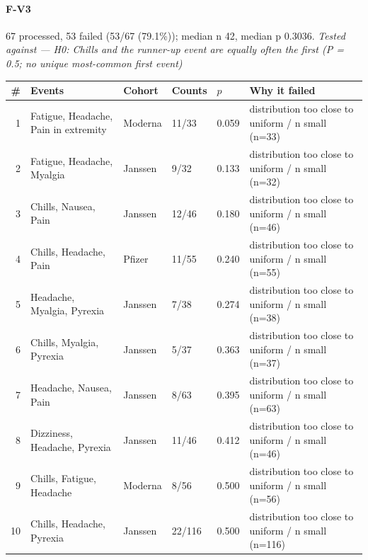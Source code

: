 \documentclass[11pt]{article}
\begin{document}
\paragraph{F-V3} 67 processed, 53 failed (53/67 (79.1\%)); median n 42, median p 0.3036. \emph{Tested against --- H0: Chills and the runner-up event are equally often the first (P = 0.5; no unique most-common first event)} \\
\begin{longtable}{@{}r p{3.9cm} p{2.5cm} l l p{4.4cm}@{}}
\toprule
\# & Events & Cohort & Counts & $p$ & Why it failed \\
\midrule \endhead
1 & Fatigue, Headache, Pain in extremity & Moderna & 11/33 & 0.059 & distribution too close to uniform / n small (n=33) \\
2 & Fatigue, Headache, Myalgia & Janssen & 9/32 & 0.133 & distribution too close to uniform / n small (n=32) \\
3 & Chills, Nausea, Pain & Janssen & 12/46 & 0.180 & distribution too close to uniform / n small (n=46) \\
4 & Chills, Headache, Pain & Pfizer & 11/55 & 0.240 & distribution too close to uniform / n small (n=55) \\
5 & Headache, Myalgia, Pyrexia & Janssen & 7/38 & 0.274 & distribution too close to uniform / n small (n=38) \\
6 & Chills, Myalgia, Pyrexia & Janssen & 5/37 & 0.363 & distribution too close to uniform / n small (n=37) \\
7 & Headache, Nausea, Pain & Janssen & 8/63 & 0.395 & distribution too close to uniform / n small (n=63) \\
8 & Dizziness, Headache, Pyrexia & Janssen & 11/46 & 0.412 & distribution too close to uniform / n small (n=46) \\
9 & Chills, Fatigue, Headache & Moderna & 8/56 & 0.500 & distribution too close to uniform / n small (n=56) \\
10 & Chills, Headache, Pyrexia & Janssen & 22/116 & 0.500 & distribution too close to uniform / n small (n=116) \\
\bottomrule
\end{longtable}
\end{document}
